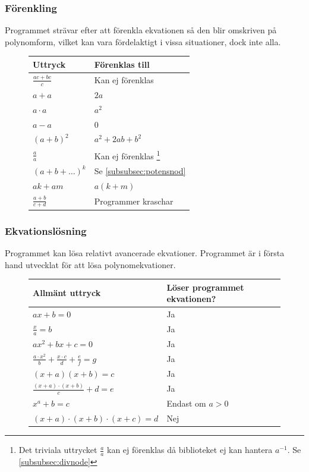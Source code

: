 \documentclass[12pt,a4paper]{article}
\begin{document}
\subsubsection{Förenkling}
Programmet strävar efter att förenkla ekvationen så den blir omskriven på polynomform, vilket kan vara fördelaktigt i vissa situationer, dock inte alla.
\begin{savenotes}
\begin{figure}[h!]
  \centering
  \begin{tabular}{l|l}
    \textbf{Uttryck} & \textbf{Förenklas till} \\
    \hline
    \(\frac{ac + bc}{c}\) & Kan ej förenklas \\
    \(a+a\) & \(2a\) \\
    \(a \cdot a\) & \(a^{2}\) \\
    \(a - a\) & \(0\) \\
    \((a+b)^{2}\) & \(a^{2} + 2ab + b^{2}\) \\
    \(\frac{a}{a}\) & Kan ej förenklas \footnote{Det triviala uttrycket \(\frac{a}{a}\) kan ej förenklas då biblioteket ej kan hantera \(a^{-1}\). Se \ref{subsubsec:divnode}} \\
    \((a+b+\ldots)^{k}\) & Se \ref{subsubsec:potensnod} \\
    \(ak+am\) & \(a(k+m)\) \\
    \(\frac{a+b}{c+d}\) & Programmer kraschar
  \end{tabular}
  \label{tab:expressions}
\end{figure}
\end{savenotes}

\subsubsection{Ekvationslösning}
Programmet kan lösa relativt avancerade ekvationer. Programmet är i första hand utvecklat för att lösa polynomekvationer.

\begin{figure}[h!]
  \centering
  \begin{tabular}{l|l}
    \textbf{Allmänt uttryck} & \textbf{Löser programmet ekvationen?} \\
    \hline
    \(ax+b=0\) & Ja \\
    \(\frac{x}{a}=b\) & Ja \\
    \(ax^2+bx+c=0\) & Ja \\
    \(\frac{a \cdot x^2}{b}+\frac{x \cdot c}{d}+\frac{e}{f}=g\) & Ja \\
    \((x+a)(x+b)=c\) & Ja \\
    \(\frac{(x+a)\cdot(x+b)}{c}+d=e\) & Ja \\
    \(x^a+b=c\) & Endast om \( a>0 \) \\
    \((x+a)\cdot(x+b)\cdot(x+c)=d\) & Nej 
  \end{tabular}
  \label{tab:lexer_patterns}
\end{figure}
\end{document}
